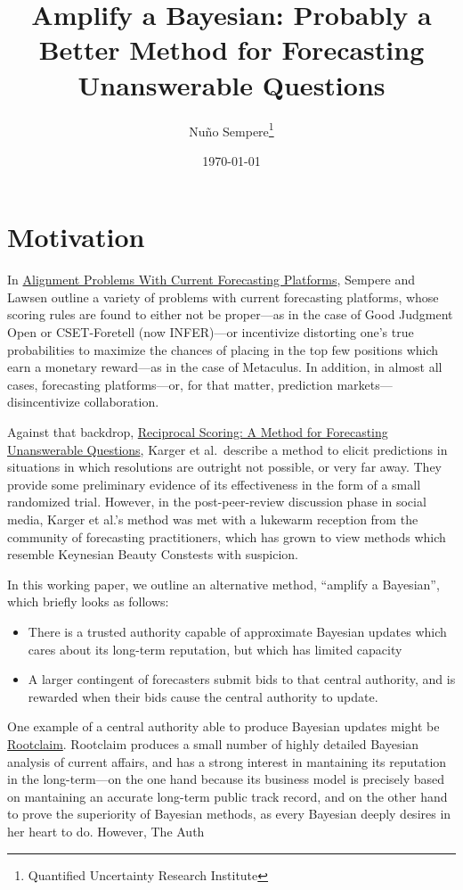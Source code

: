 \documentclass[]{article}
\title{Amplify a Bayesian: Probably a Better Method for Forecasting
Unanswerable Questions}
\author{Nuño Sempere\footnote{Quantified Uncertainty Research Institute}}
\date{\today}
\providecommand{\tightlist}{%
  \setlength{\itemsep}{0pt}\setlength{\parskip}{0pt}}
\begin{document}
\maketitle

\hypertarget{motivation}{%
\section{Motivation}\label{motivation}}

In \href{https://arxiv.org/abs/2106.11248}{Alignment Problems With
Current Forecasting Platforms}, Sempere and Lawsen outline a variety of
problems with current forecasting platforms, whose scoring rules are
found to either not be proper---as in the case of Good Judgment Open or
CSET-Foretell (now INFER)---or incentivize distorting one's true
probabilities to maximize the chances of placing in the top few
positions which earn a monetary reward---as in the case of Metaculus. In
addition, in almost all cases, forecasting platforms---or, for that
matter, prediction markets---disincentivize collaboration.

Against that backdrop,
\href{https://papers.ssrn.com/sol3/papers.cfm?abstract_id=3954498}{Reciprocal
Scoring: A Method for Forecasting Unanswerable Questions}, Karger et
al.~describe a method to elicit predictions in situations in which
resolutions are outright not possible, or very far away. They provide
some preliminary evidence of its effectiveness in the form of a small
randomized trial. However, in the post-peer-review discussion phase in
social media, Karger et al.'s method was met with a lukewarm reception
from the community of forecasting practitioners, which has grown to view
methods which resemble Keynesian Beauty Constests with suspicion.

In this working paper, we outline an alternative method, ``amplify a
Bayesian'', which briefly looks as follows:

\begin{itemize}
\tightlist
\item
  There is a trusted authority capable of approximate Bayesian updates
  which cares about its long-term reputation, but which has limited
  capacity\\
\item
  A larger contingent of forecasters submit bids to that central
  authority, and is rewarded when their bids cause the central authority
  to update.
\end{itemize}

One example of a central authority able to produce Bayesian updates
might be \href{https://www.rootclaim.com/}{Rootclaim}. Rootclaim
produces a small number of highly detailed Bayesian analysis of current
affairs, and has a strong interest in mantaining its reputation in the
long-term---on the one hand because its business model is precisely
based on mantaining an accurate long-term public track record, and on
the other hand to prove the superiority of Bayesian methods, as every
Bayesian deeply desires in her heart to do. However, The Auth
\end{document}
